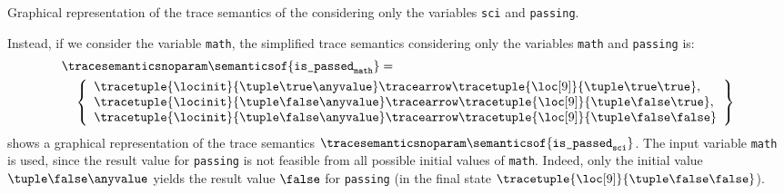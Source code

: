 \begin{example}
\begin{marginfigure}[*-9]
\caption{Graphical representation of the trace semantics of the  considering only the variables \texttt{sci} and \texttt{passing}.}
\end{marginfigure}

Instead, if we consider the variable \texttt{math}, the simplified trace semantics considering only the variables \texttt{math} and \texttt{passing} is:
\begin{align*}
  &{\tracesemanticsnoparam\semanticsof{\texttt{is\_passed}_\texttt{math}}
  =}\\
  &\quad\left\{
    \begin{array}{l}
    \tracetuple{\locinit}{\tuple\true\anyvalue}\tracearrow\tracetuple{\loc[9]}{\tuple\true\true}, \\
    \tracetuple{\locinit}{\tuple\false\anyvalue}\tracearrow\tracetuple{\loc[9]}{\tuple\false\true}, \\
    \tracetuple{\locinit}{\tuple\false\anyvalue}\tracearrow\tracetuple{\loc[9]}{\tuple\false\false}
  \end{array}
  \right\}
\end{align*}
 shows a graphical representation of the trace semantics $\tracesemanticsnoparam\semanticsof{\texttt{is\_passed}_\texttt{sci}}$.
The input variable \texttt{math} is used, since the result value for \texttt{passing} is not feasible from all possible initial values of \texttt{math}.
Indeed, only the initial value $\tuple\false\anyvalue$ yields the result value $\false$ for \texttt{passing} (in the final state $\tracetuple{\loc[9]}{\tuple\false\false}$).
\end{example}


